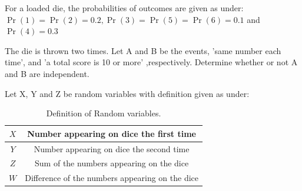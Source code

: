 \documentclass[]{article}
\begin{document}
\providecommand{\qfunc}[1]{\ensuremath{Q\left(#1\right)}}
\providecommand{\gauss}[2]{\mathcal{N}\ensuremath{\left(#1,#2\right)}}
\providecommand{\diff}[2]{\ensuremath{\frac{d{#1}}{d{#2}}}}
\providecommand{\myceil}[1]{\left \lceil #1 \right \rceil }
\newcommand\figref{Fig.~\ref}
\newcommand\tabref{Table~\ref}
\newcommand{\sinc}{\,\text{sinc}\,}
\newcommand{\rect}{\,\text{rect}\,}

\let\vec\mathbf

For a loaded die, the probabilities of outcomes are given as under:
$\Pr(1) = \Pr(2) = 0.2, \Pr(3) = \Pr(5) = \Pr(6) = 0.1$ and $\Pr(4) = 0.3$

The die is thrown two times. Let A and B be the events, 'same number each time', and
'a total score is 10 or more' ,respectively. Determine whether or not A and B are independent.

\solution
Let X, Y and Z be random variables with definition given as under:
\begin{table}[H]
\centering
\begin{tabular}{|c|c|}
    \hline
    $X$ & Number appearing on dice the first time\\
    \hline
    $Y$ & Number appearing on dice the second time\\
    \hline
    $Z$ & Sum of the numbers appearing on the dice\\
    \hline
    $W$ & Difference of the numbers appearing on the dice\\
    \hline
\end{tabular}
\label{tab:ncert/12/13/3/1/}
\caption{Definition of Random variables.}
\end{table}
\end{document}
